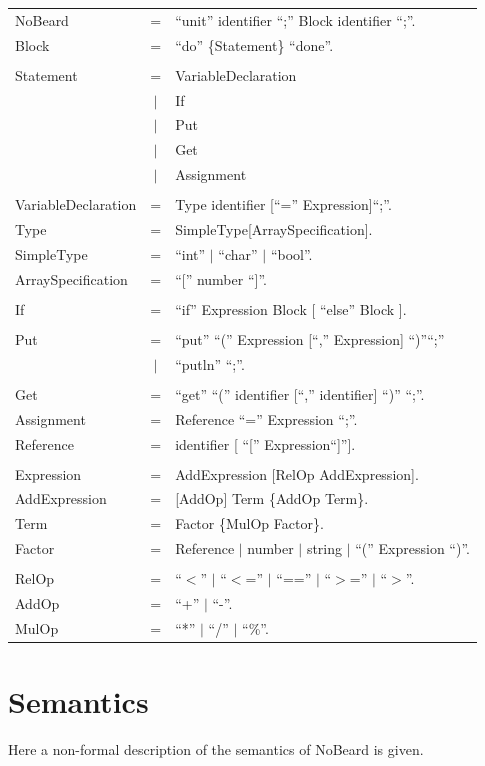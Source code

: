 \documentclass[11pt]{report}
\newcommand{\leongage}{NoBeard}
\newenvironment{grammar}[2] %
	{
		\newcommand{\completerule}[2]{##1 & = & ##2.\\}
		\newcommand{\startrule}[2]{##1 & = & ##2\\}
		\newcommand{\alternativerule}[1]{ & $|$ & ##1\\}
		\newcommand{\alternativeend}[1]{ & $|$ & ##1.\\}
		\newcommand{\finishrule}[1]{ & & ##1.\\}
		\begin{tabular}{p{#1} c p{#2}}
	}
	{	\end{tabular}
	}
\begin{document}
	\begin{grammar}{}{}
		\completerule{NoBeard}{``unit'' identifier ``;'' Block identifier ``;''}

		\completerule{Block}{``do'' \{Statement\} ``done''}

		\\

		\startrule{Statement}{VariableDeclaration}
		\alternativerule{If}
		\alternativerule{Put}
		\alternativerule{Get}
		\alternativerule{Assignment}
		\\
		\completerule{VariableDeclaration}{Type identifier [``='' Expression]``;''}
		\completerule{Type}{SimpleType[ArraySpecification]}
		\completerule{SimpleType}{``int'' $|$ ``char'' $|$ ``bool''}
		\completerule{ArraySpecification}{``['' number ``]''}
		\\
		\completerule{If}{``if'' Expression Block [ ``else'' Block ]}
		\\
		\startrule{Put}{``put'' ``('' Expression [``,'' Expression] ``)''``;''}
		\alternativeend{``putln'' ``;''}
		\\
		\completerule{Get}{``get'' ``('' identifier [``,'' identifier] ``)'' ``;''}
		\completerule{Assignment}{Reference ``='' Expression ``;''}
		\completerule{Reference}{identifier [ ``['' Expression``]'']}
		\\
		\completerule{Expression}{AddExpression [RelOp AddExpression]}
		\completerule{AddExpression}{[AddOp] Term \{AddOp Term\}}
		\completerule{Term}{Factor \{MulOp Factor\}}
		\completerule{Factor}{Reference $|$ number $|$ string $|$ ``('' Expression ``)''}
		\\
		\completerule{RelOp}{``$<$'' $|$ ``$<$='' $|$ ``=='' $|$ ``$>$='' $|$ ``$>$''}
		\completerule{AddOp}{``+'' $|$ ``-''}
		\completerule{MulOp}{``*'' $|$ ``/'' $|$ ``\%''}	
	\end{grammar}

\section{Semantics}
Here a non-formal description of the semantics of \leongage{} is given.
\end{document}
